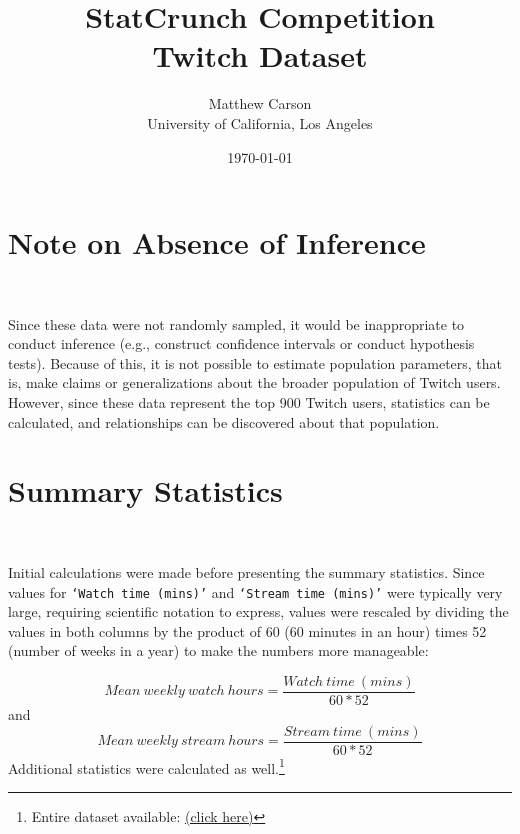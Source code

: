 \documentclass[12pt]{article}
\title{StatCrunch Competition\\ Twitch Dataset}
\author{Matthew Carson\\ University of California, Los Angeles}
\date{\today}
\begin{document}
\begin{titlepage}
\maketitle
\thispagestyle{empty} %
\end{titlepage}
\tableofcontents

\listoftables

\listoffigures
\newpage

\section{Note on Absence of Inference}\

Since these data were not randomly sampled, it would be inappropriate to conduct inference (e.g., construct confidence intervals or conduct hypothesis tests). Because of this, it is not possible to estimate population parameters, that is, make claims or generalizations about the broader population of Twitch users. However, since these data represent the top 900 Twitch users, statistics can be calculated, and relationships can be discovered about that population.

\section{Summary Statistics}\

Initial calculations were made before presenting the summary statistics. Since values for \texttt{`Watch time (mins)'} and \texttt{`Stream time (mins)'} were typically very large, requiring scientific notation to express, values were rescaled by dividing the values in both columns by the product of 60 (60 minutes in an hour) times 52 (number of weeks in a year) to make the numbers more manageable:

\begin{equation}
Mean\ weekly\ watch\ hours = \dfrac{Watch\ time\ (mins)}{60 \ast 52}
\end{equation}
and
\begin{equation}
Mean\ weekly\ stream\ hours = \dfrac{Stream\ time\ (mins)}{60 \ast 52}
\end{equation}
\newline
Additional statistics were calculated as well.\footnote{Entire dataset available: \href{https://www.statcrunch.com/app/index.html?dataid=4597814&token=OTI3Z8\%2F0N6hSC1KVw9hTXmyjHLnuZvqCMyuxkgn1QRYPhIQfDVLUFClF3Y41ShOi4C\%2BMKL5\%2FHgpBTXKukjWOPGD4pN\%2FCkiobeyKouIjPB7LoPvHOTDN7wUNtPZQd2\%2BNjOwAtSMQl9aKQrbthjCSuuSihsliiTo0MvakPDYN0lwiE8N11ITBSTS9QJH9QgHEmO4ahoV6IkASuVdKosV\%2FJSQ\%3D\%3D}{(click here)}}
\end{document}
